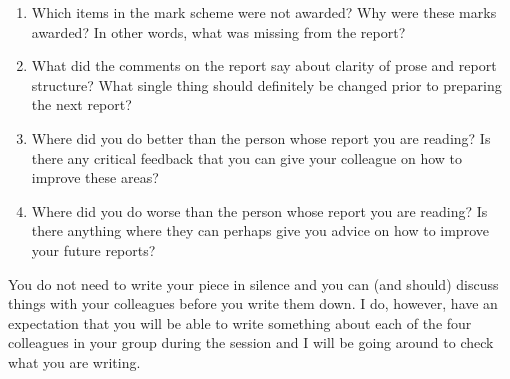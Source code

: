 \documentclass[a4paper]{article}
\begin{document}
\begin{enumerate}
 \item Which items in the mark scheme were not awarded?  Why were these marks awarded?  In other words, what was missing from the report? 
 \item What did the comments on the report say about clarity of prose and report structure?  What single thing should definitely be changed prior to preparing the next report? 
 \item Where did you do better than the person whose report you are reading?  Is there any critical feedback that you can give your colleague on how to improve these areas?
 \item Where did you do worse than the person whose report you are reading?  Is there anything where they can perhaps give you advice on how to improve your future reports?
\end{enumerate}

You do not need to write your piece in silence and you can (and should) discuss things with your colleagues before you write them down.  I do, however, have an expectation that you will be able to 
write something about each of the four colleagues in your group during the session and I will be going around to check what you are writing.
\end{document}
